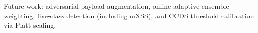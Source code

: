 \documentclass[conference]{IEEEtran}
\begin{document}
Future work: adversarial payload augmentation, online adaptive ensemble
weighting, five-class detection (including mXSS), and CCDS threshold
calibration via Platt scaling.




\end{document}
